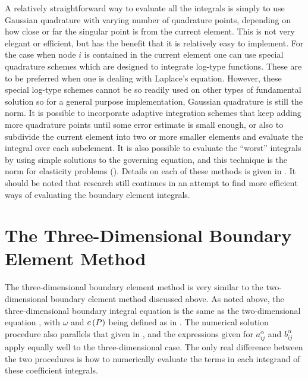 A relatively straightforward way to evaluate all the integrals is simply to use
Gaussian quadrature with varying number of quadrature points, depending on how
close or far the singular point is from the current element.  This is not very
elegant or efficient, but has the benefit that it is relatively easy to
implement.  For the case when node $i$ is contained in the current element one
can use special quadrature schemes which are designed to integrate log-type
functions.  These are to be preferred when one is dealing with Laplace's
equation.  However, these special log-type schemes cannot be so readily used
on other types of fundamental solution so for a general purpose
implementation, Gaussian quadrature is still the norm. It is possible to
incorporate adaptive integration schemes that keep adding more quadrature
points until some error estimate is small enough, or also to subdivide the
current element into two or more smaller elements and evaluate the integral
over each subelement.  It is also possible to evaluate the ``worst'' integrals
by using simple solutions to the governing equation, and this technique is the
norm for elasticity problems (). Details on each
of these methods is given in .  It should be noted that
research still continues in an attempt to find more efficient ways of
evaluating the boundary element integrals.

  


\section{The Three-Dimensional Boundary Element Method}
\label{sec:The3-DBE}

The three-dimensional boundary element method is very similar to the
two-dimensional boundary element method discussed above.  As noted above, the
three-dimensional boundary integral equation is the same as the
two-dimensional equation , with $\omega$ and $ c\left( P \right) $ being
defined as in .  The numerical solution procedure also
parallels that given in , and the expressions given for
$a_{ij}^{\alpha}$ and $b_{ij}^{\alpha}$ apply equally well to the
three-dimensional case.  The only real difference between the two procedures
is how to numerically evaluate the terms in each integrand of these
coefficient integrals.

